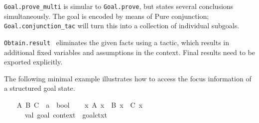 \begin{isabellebody}
\begin{isamarkuptext}
\begin{description}
  \item \verb|Goal.prove_multi| is simular to \verb|Goal.prove|, but
  states several conclusions simultaneously.  The goal is encoded by
  means of Pure conjunction; \verb|Goal.conjunction_tac| will turn this
  into a collection of individual subgoals.

  \item \verb|Obtain.result|~ eliminates the
  given facts using a tactic, which results in additional fixed
  variables and assumptions in the context.  Final results need to be
  exported explicitly.

  \end{description}%
\end{isamarkuptext}%
\isamarkuptrue%
%
\endisatagmlref
{\isafoldmlref}%
%
\isadelimmlref
%
\endisadelimmlref
%
\isadelimmlex
%
\endisadelimmlex
%
\isatagmlex
%
\begin{isamarkuptext}%
The following minimal example illustrates how to access
  the focus information of a structured goal state.%
\end{isamarkuptext}%
\isamarkuptrue%
%
\endisatagmlex
{\isafoldmlex}%
%
\isadelimmlex
%
\endisadelimmlex
{}\isamarkupfalse%
\isanewline
%
\isadelimproof
\ \ %
\endisadelimproof
%
\isatagproof
{}\isamarkupfalse%
\ A\ B\ C\ {}{}\ {}{}a\ {}\ bool{}\isanewline
\isanewline
\ \ \isamarkupfalse%
\ {}{}x{}\ A\ x\ {}\ B\ x\ {}\ C\ x{}%
\endisatagproof
{\isafoldproof}%
%
\isadelimproof
\isanewline
%
\endisadelimproof
%
\isadelimML
\ \ \ \ %
\endisadelimML
%
\isatagML
{}\isamarkupfalse%
\isanewline
\ \ \ \ {}\isanewline
\ \ \ \ \ \ val\ {}goal{}\ context\ {}\ goal{}ctxt{}\ {}{}{}{}\ {}\ %

\end{isabellebody}
